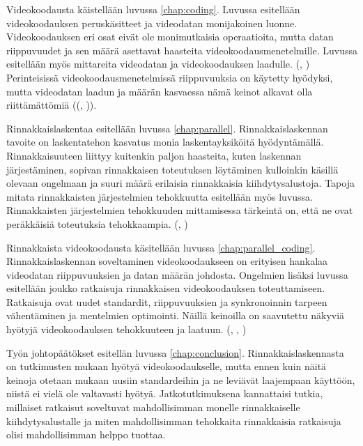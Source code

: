 Videokoodausta käistellään luvussa \ref{chap:coding}. Luvussa esitellään
videokoodauksen peruskäsitteet ja videodatan monijakoinen luonne.
Videokoodauksen eri osat eivät ole monimutkaisia operaatioita, mutta datan
riippuvuudet ja sen määrä asettavat haasteita videokoodausmenetelmille. Luvussa
esitellään myös mittareita videodatan ja videokoodauksen laadulle. (\citealt{h264}, \citealt{du})
Perinteisissä videokoodausmenetelmissä riippuvuuksia on käytetty hyödyksi,
mutta videodatan laadun ja määrän kasvaessa nämä keinot alkavat olla
riittämättömiä ((\citealt{chi}, \citealt{xu})).

Rinnakkaislaskentaa esitellään luvussa \ref{chap:parallel}. Rinnakkaislaskennan
tavoite on laskentatehon kasvatus monia laskentayksiköitä hyödyntämällä.
Rinnakkaisuuteen liittyy kuitenkin paljon haasteita, kuten laskennan
järjestäminen, sopivan rinnakkaisen toteutuksen löytäminen kulloinkin käsillä
olevaan ongelmaan ja suuri määrä erilaisia rinnakkaisia kiihdytysalustoja.
Tapoja mitata rinnakkaisten järjestelmien tehokkuutta esitellään myös luvussa.
Rinnakkaisten järjestelmien tehokkuuden mittamisessa tärkeintä on, että ne ovat
peräkkäisiä toteutuksia tehokkaampia. (\citealt{intro}, \citealt{})

Rinnakkaista videokoodausta käsitellään luvussa \ref{chap:parallel_coding}.
Rinnakkaislaskennan soveltaminen videokoodaukseen on erityisen hankalaa
videodatan riippuvuuksien ja datan määrän johdosta. Ongelmien lisäksi
luvussa esitellään joukko ratkaisuja rinnakkaisen videokoodauksen
toteuttamiseen. Ratkaisuja ovat uudet standardit, riippuvuuksien ja
synkronoinnin tarpeen vähentäminen ja mentelmien optimointi. Näillä keinoilla
on saavutettu näkyviä hyötyjä videokoodauksen tehokkuuteen ja laatuun.
(\citealt{pieters}, \citealt{chi}, \citealt{xu})

Työn johtopäätökset esitellän luvussa \ref{chap:conclusion}.
Rinnakkaislaskennasta on tutkimusten mukaan hyötyä videokoodaukselle, mutta
ennen kuin näitä keinoja otetaan mukaan uusiin standardeihin ja ne leviävät
laajempaan käyttöön, niistä ei vielä ole valtavasti hyötyä. Jatkotutkimuksena
kannattaisi tutkia, millaiset ratkaisut soveltuvat mahdollisimman monelle
rinnakkaiselle kiihdytysalustalle ja miten mahdollisimman tehokkaita
rinnakkaisia ratkaisuja olisi mahdollisimman helppo tuottaa.



